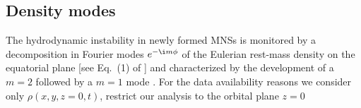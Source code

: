 


\subsection{Density modes} \label{sec:bns_sims:method:modes}


The hydrodynamic instability in newly formed \acp{MNS} 
is monitored by a decomposition in Fourier modes
$e^{-\i m\phi}$ of the Eulerian rest-mass density on the equatorial plane 
[see Eq.~(1) of \citep{Radice:2016gym}] and characterized by the
development of a $m=2$ followed by a $m=1$ mode 
\citep{East:2015vix,Paschalidis:2015mla,Radice:2016gym,Lehner:2016wjg,Bernuzzi:2013rza,Kastaun:2014fna}.
%
%
%
%
For the data availability reasons we consider only $\rho(x,y,z=0,t)$, 
\ie restrict our analysis to the orbital plane $z=0$

